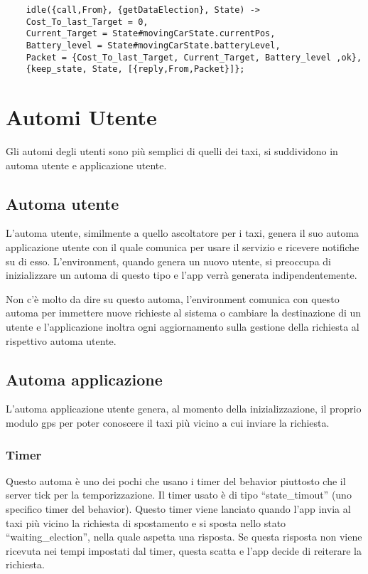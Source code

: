 \begin{lstlisting}
	idle({call,From}, {getDataElection}, State) ->
	Cost_To_last_Target = 0,
	Current_Target = State#movingCarState.currentPos,
	Battery_level = State#movingCarState.batteryLevel,
	Packet = {Cost_To_last_Target, Current_Target, Battery_level ,ok},
	{keep_state, State, [{reply,From,Packet}]};
\end{lstlisting}

\section{Automi Utente} \label{automiUtenti}
Gli automi degli utenti sono più semplici di quelli dei taxi, si suddividono in automa utente e applicazione utente. 

\subsection{Automa utente}
L'automa utente, similmente a quello ascoltatore per i taxi, genera il suo automa applicazione utente con il quale comunica per usare il servizio e ricevere notifiche su di esso. L'environment, quando genera un nuovo utente, si preoccupa di inizializzare un automa di questo tipo e l'app verrà generata indipendentemente. 

Non c'è molto da dire su questo automa, l'environment comunica con questo automa per immettere nuove richieste al sistema o cambiare la destinazione di un utente e l'applicazione inoltra ogni aggiornamento sulla gestione della richiesta al rispettivo automa utente.

\subsection{Automa applicazione}
L'automa applicazione utente genera, al momento della inizializzazione, il proprio modulo gps per poter conoscere il taxi più vicino a cui inviare la richiesta. 

\subsubsection{Timer} \label{timerAppUtente}
Questo automa è uno dei pochi che usano i timer del behavior piuttosto che il server tick per la temporizzazione. Il timer usato è di tipo ``state\_timout'' (uno specifico timer del behavior). 
Questo timer viene lanciato quando l'app invia al taxi più vicino la richiesta di spostamento e si sposta nello stato ``waiting\_election'', nella quale aspetta una risposta. Se questa risposta non viene ricevuta nei tempi impostati dal timer, questa scatta e l'app decide di reiterare la richiesta. 

